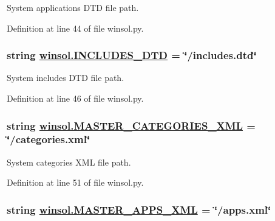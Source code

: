 System applications DTD file path. 



Definition at line 44 of file winsol.py.\hypertarget{namespacewinsol_9a613f23f40b0893b5d130ccfc1a899e}{
\subsubsection[INCLUDES\_\-DTD]{\setlength{\rightskip}{0pt plus 5cm}string \hyperlink{namespacewinsol_9a613f23f40b0893b5d130ccfc1a899e}{winsol.INCLUDES\_\-DTD} = \char`\"{}/includes.dtd\char`\"{}}}
\label{namespacewinsol_9a613f23f40b0893b5d130ccfc1a899e}


System includes DTD file path. 



Definition at line 46 of file winsol.py.\hypertarget{namespacewinsol_3af9670786db792ef5991af5c3ae5793}{
\subsubsection[MASTER\_\-CATEGORIES\_\-XML]{\setlength{\rightskip}{0pt plus 5cm}string \hyperlink{namespacewinsol_3af9670786db792ef5991af5c3ae5793}{winsol.MASTER\_\-CATEGORIES\_\-XML} = \char`\"{}/categories.xml\char`\"{}}}
\label{namespacewinsol_3af9670786db792ef5991af5c3ae5793}


System categories XML file path. 



Definition at line 51 of file winsol.py.\hypertarget{namespacewinsol_a0bf1d73390881ffdffdc95bee515f38}{
\subsubsection[MASTER\_\-APPS\_\-XML]{\setlength{\rightskip}{0pt plus 5cm}string \hyperlink{namespacewinsol_a0bf1d73390881ffdffdc95bee515f38}{winsol.MASTER\_\-APPS\_\-XML} = \char`\"{}/apps.xml\char`\"{}}}
\label{namespacewinsol_a0bf1d73390881ffdffdc95bee515f38}


